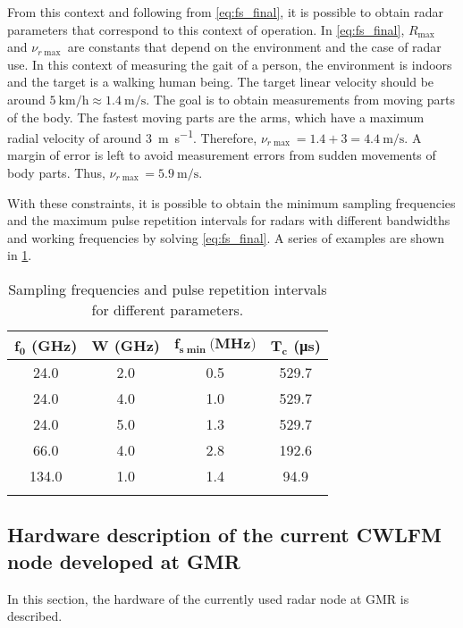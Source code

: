 From this context and following from \cref{eq:fs_final}, it is possible to obtain radar parameters that correspond to this context of operation. In \cref{eq:fs_final}, $R_{\max}$ and $\nu_{r\max}$ are constants that depend on the environment and the case of radar use. In this context of measuring the gait of a person, the environment is indoors and the target is a walking human being. The target linear velocity should be around $\SI{5}{\kilo\meter\per\hour} \approx \SI{1.4}{\meter\per\second}$. The goal is to obtain measurements from moving parts of the body. The fastest moving parts are the arms, which have a maximum radial velocity of around \SI{3}{\meter\per\second}. Therefore, $\nu_{r\max} = 1.4 + 3 = \SI{4.4}{\meter\per\second}$. A margin of error is left to avoid measurement errors from sudden movements of body parts. Thus, $\nu_{r\max} =\SI{5.9}{\meter\per\second}$.

With these constraints, it is possible to obtain the minimum sampling frequencies and the maximum pulse repetition intervals for radars with different bandwidths and working frequencies by solving \cref{eq:fs_final}. A series of examples are shown in \cref{tab:fs_Tc}.

\begin{longtable}{@{}cccc@{}}
	\toprule
	$\mathbf{f_0}$ \textbf{(GHz)}& $\mathbf{W}$ \textbf{(GHz)} & $\mathbf{f_{s\min}} \textbf{(MHz)}$& $\mathbf{T_c}$ \textbf{(\si{\micro\second})} \\* \midrule 
	\endhead
	24.0 & 2.0 & 0.5 & 529.7 \\
	24.0 & 4.0 & 1.0 & 529.7 \\
	24.0 & 5.0 & 1.3 & 529.7 \\
	66.0 & 4.0 & 2.8 & 192.6 \\
	134.0 & 1.0 & 1.4 & 94.9 \\* \bottomrule
	\caption{Sampling frequencies and pulse repetition intervals for different parameters.}
	\label{tab:fs_Tc} 
\end{longtable}
\subsection{Hardware description of the current CWLFM node developed at GMR}

In this section, the hardware of the currently used radar node at GMR is described.
